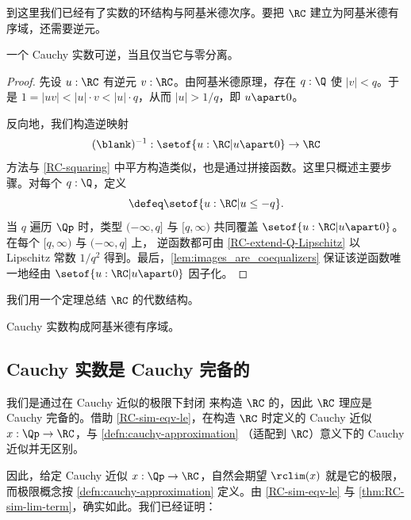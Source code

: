 到这里我们已经有了实数的环结构与阿基米德次序。要把 $\RC$ 建立为阿基米德有序域，还需要逆元。

\begin{thm}
  一个 Cauchy 实数可逆，当且仅当它与零分离。
\end{thm}

\begin{proof}
  先设 $u : \RC$ 有逆元 $v : \RC$。由阿基米德原理，存在 $q :
  \Q$ 使 $|v| < q$。于是 $1 = |u v| < |u| \cdot v < |u| \cdot q$，从而 $|u| >
  1/q$，即 $u \apart 0$。

  反向地，我们构造逆映射
  \begin{equation*}
    ({\blank})^{-1} : \setof{ u : \RC | u \apart 0 } \to \RC
  \end{equation*}
  方法与 \cref{RC-squaring} 中平方构造类似，也是通过拼接函数。这里只概述主要步骤。对每个 $q : \Q$，定义
  \begin{equation*}
    [q, \infty) \defeq \setof{u : \RC | q \leq u}
    \qquad\text{and}\qquad
    (-\infty, q] \defeq \setof{u : \RC | u \leq -q}.
  \end{equation*}
  当 $q$ 遍历 $\Qp$ 时，类型 $(-\infty, q]$ 与 $[q, \infty)$ 共同覆盖
  $\setof{u : \RC | u \apart 0}$。在每个 $[q, \infty)$ 与 $(-\infty, q]$ 上，
  逆函数都可由 \cref{RC-extend-Q-Lipschitz}
  以 Lipschitz 常数 $1/q^2$ 得到。最后，\cref{lem:images_are_coequalizers}
  保证该逆函数唯一地经由 $\setof{ u : \RC | u
    \apart 0 }$ 因子化。
\end{proof}

我们用一个定理总结 $\RC$ 的代数结构。

\begin{thm} \label{RC-archimedean-ordered-field}
  Cauchy 实数构成阿基米德有序域。
\end{thm}

\subsection{Cauchy 实数是 Cauchy 完备的}
\label{sec:cauchy-reals-cauchy-complete}

我们是通过在 Cauchy 近似的极限下封闭 \Q 来构造 $\RC$ 的，因此
$\RC$ 理应是 Cauchy 完备的。借助 \cref{RC-sim-eqv-le}，在构造
$\RC$ 时定义的 Cauchy 近似 $x : \Qp \to \RC$，与 \cref{defn:cauchy-approximation}
（适配到 $\RC$）意义下的 Cauchy 近似并无区别。

因此，给定 Cauchy 近似 $x : \Qp \to \RC$，自然会期望
$\rclim(x)$ 就是它的极限，而极限概念按
\cref{defn:cauchy-approximation} 定义。由 \cref{RC-sim-eqv-le} 与
\cref{thm:RC-sim-lim-term}，确实如此。我们已经证明：

